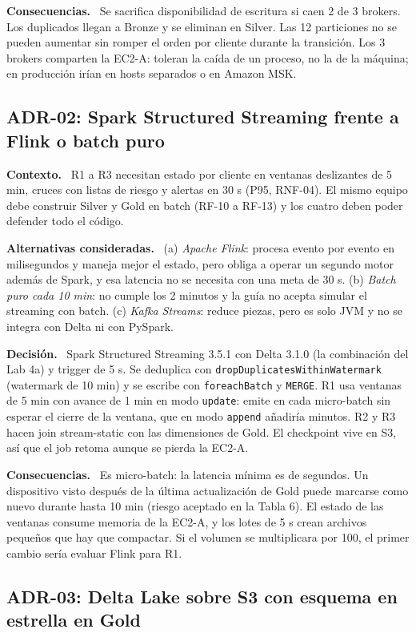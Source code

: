 \documentclass[12pt,letterpaper]{article}
\newcommand{\code}[1]{{\small\texttt{#1}}}
\newcommand{\adrpart}[1]{\textbf{#1.}~}
\begin{document}
\adrpart{Consecuencias} Se sacrifica disponibilidad de escritura si caen 2 de 3 brokers. Los duplicados llegan a Bronze y se eliminan en Silver. Las 12 particiones no se pueden aumentar sin romper el orden por cliente durante la transición. Los 3 brokers comparten la EC2-A: toleran la caída de un proceso, no la de la máquina; en producción irían en hosts separados o en Amazon MSK.

\subsection*{ADR-02: Spark Structured Streaming frente a Flink o batch puro}

\adrpart{Contexto} R1 a R3 necesitan estado por cliente en ventanas deslizantes de 5 min, cruces con listas de riesgo y alertas en 30 s (P95, RNF-04). El mismo equipo debe construir Silver y Gold en batch (RF-10 a RF-13) y los cuatro deben poder defender todo el código.

\adrpart{Alternativas consideradas} (a) \emph{Apache Flink}: procesa evento por evento en milisegundos y maneja mejor el estado, pero obliga a operar un segundo motor además de Spark, y esa latencia no se necesita con una meta de 30 s. (b) \emph{Batch puro cada 10 min}: no cumple los 2 minutos y la guía no acepta simular el streaming con batch. (c) \emph{Kafka Streams}: reduce piezas, pero es solo JVM y no se integra con Delta ni con PySpark.

\adrpart{Decisión} Spark Structured Streaming 3.5.1 con Delta 3.1.0 (la combinación del Lab 4a) y trigger de 5 s. Se deduplica con \code{dropDuplicatesWithinWatermark} (watermark de 10 min) y se escribe con \code{foreachBatch} y \code{MERGE}. R1 usa ventanas de 5 min con avance de 1 min en modo \code{update}: emite en cada micro-batch sin esperar el cierre de la ventana, que en modo \code{append} añadiría minutos. R2 y R3 hacen join stream-static con las dimensiones de Gold. El checkpoint vive en S3, así que el job retoma aunque se pierda la EC2-A.

\adrpart{Consecuencias} Es micro-batch: la latencia mínima es de segundos. Un dispositivo visto después de la última actualización de Gold puede marcarse como nuevo durante hasta 10 min (riesgo aceptado en la Tabla 6). El estado de las ventanas consume memoria de la EC2-A, y los lotes de 5 s crean archivos pequeños que hay que compactar. Si el volumen se multiplicara por 100, el primer cambio sería evaluar Flink para R1.

\subsection*{ADR-03: Delta Lake sobre S3 con esquema en estrella en Gold}
\end{document}
